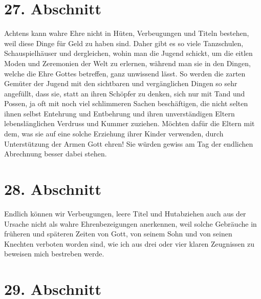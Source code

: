 \section{27. Abschnitt} \label{kap9_ab27}

Achtens kann wahre Ehre nicht in Hüten, Verbeugungen und Titeln bestehen, weil
diese Dinge für Geld zu haben sind. Daher gibt es so viele
Tanzschulen,
Schauspielhäuser und dergleichen, wohin man die Jugend schickt,
um die
eitlen Moden und
Zeremonien der Welt zu erlernen, während man sie in den Dingen, welche die Ehre
Gottes betreffen, ganz unwissend lässt. So werden die zarten Gemüter der Jugend
mit den sichtbaren und vergänglichen Dingen so sehr angefüllt, dass sie, statt
an
ihren Schöpfer zu denken, sich nur mit Tand und Possen, ja oft mit noch viel
schlimmeren Sachen beschäftigen, die nicht selten ihnen selbst Entehrung und
Entbehrung und ihren unverständigen Eltern lebenslänglichen Verdruss und Kummer
zuziehen. Möchten dafür die Eltern mit dem, was sie auf eine solche Erziehung
ihrer Kinder verwenden, durch Unterstützung der Armen Gott ehren! Sie würden
gewiss am Tag der endlichen Abrechnung besser dabei stehen.

\section{28. Abschnitt} \label{kap9_ab28}

Endlich können wir Verbeugungen, leere Titel und Hutabziehen auch aus der
Ursache nicht als wahre Ehrenbezeigungen anerkennen, weil solche Gebräuche in
früheren und späteren Zeiten von Gott, von seinem Sohn und von seinen Knechten
verboten worden sind, wie ich aus drei oder vier klaren Zeugnissen zu beweisen
mich bestreben werde.

\section{29. Abschnitt} \label{kap9_ab29}

